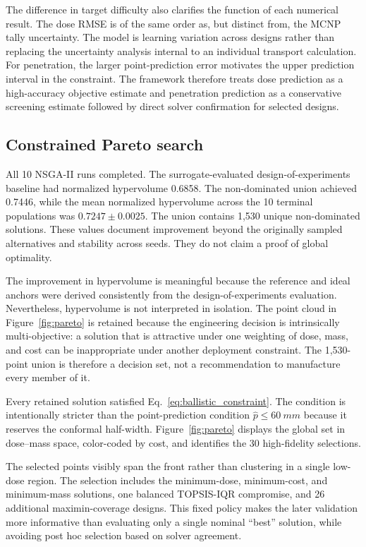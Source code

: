 \documentclass[12pt]{elsarticle}
\newcommand{\SI}[2]{#1~#2}
\begin{document}
	The difference in target difficulty also clarifies the function of each numerical result. The dose RMSE is of the same order as, but distinct from, the MCNP tally uncertainty. The model is learning variation across designs rather than replacing the uncertainty analysis internal to an individual transport calculation. For penetration, the larger point-prediction error motivates the upper prediction interval in the constraint. The framework therefore treats dose prediction as a high-accuracy objective estimate and penetration prediction as a conservative screening estimate followed by direct solver confirmation for selected designs.
	
	\subsection{Constrained Pareto search}
	
	All 10 NSGA-II runs completed. The surrogate-evaluated design-of-experiments baseline had normalized hypervolume 0.6858. The non-dominated union achieved 0.7446, while the mean normalized hypervolume across the 10 terminal populations was $0.7247\pm0.0025$. The union contains 1,530 unique non-dominated solutions. These values document improvement beyond the originally sampled alternatives and stability across seeds. They do not claim a proof of global optimality.
	
	The improvement in hypervolume is meaningful because the reference and ideal anchors were derived consistently from the design-of-experiments evaluation. Nevertheless, hypervolume is not interpreted in isolation. The point cloud in Figure~\ref{fig:pareto} is retained because the engineering decision is intrinsically multi-objective: a solution that is attractive under one weighting of dose, mass, and cost can be inappropriate under another deployment constraint. The 1,530-point union is therefore a decision set, not a recommendation to manufacture every member of it.
	
	Every retained solution satisfied Eq.~\eqref{eq:ballistic_constraint}. The condition is intentionally stricter than the point-prediction condition $\hat{p}\leq\SI{60}{mm}$ because it reserves the conformal half-width. Figure~\ref{fig:pareto} displays the global set in dose--mass space, color-coded by cost, and identifies the 30 high-fidelity selections.
	
	The selected points visibly span the front rather than clustering in a single low-dose region. The selection includes the minimum-dose, minimum-cost, and minimum-mass solutions, one balanced TOPSIS-IQR compromise, and 26 additional maximin-coverage designs. This fixed policy makes the later validation more informative than evaluating only a single nominal ``best'' solution, while avoiding post hoc selection based on solver agreement.
\end{document}
